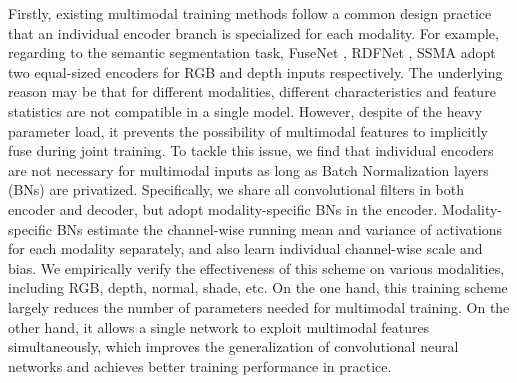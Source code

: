\documentclass[sigconf]{acmart}
\begin{document}
Firstly, existing multimodal training methods follow a common design practice that an individual encoder branch is specialized for each modality. For example, regarding to the semantic segmentation task, FuseNet \cite{DBLP:conf/accv/HazirbasMDC16}, RDFNet \cite{DBLP:conf/iccv/LeePH17}, SSMA \cite{DBLP:journals/ijcv/RussakovskyDSKS15} adopt two equal-sized encoders for RGB and depth inputs respectively. The underlying reason may be that for different modalities, different characteristics and feature statistics are not compatible in a single model. However, despite of the heavy parameter load, it prevents the possibility of multimodal features to implicitly fuse during joint training. To tackle this issue, we find that individual encoders are not necessary for multimodal inputs as long as Batch Normalization layers (BNs) \cite{DBLP:conf/icml/IoffeS15} are privatized. Specifically, we share all convolutional filters in both encoder and decoder, but adopt modality-specific BNs in the encoder. Modality-specific BNs estimate the channel-wise running mean and variance of activations for each modality separately, and also learn individual channel-wise scale and bias. We empirically verify the effectiveness of this scheme on various modalities, including RGB, depth, normal, shade, etc. On the one hand, this training scheme largely reduces the number of parameters needed for multimodal training. On the other hand, it allows a single network to exploit multimodal features simultaneously, which improves the generalization of convolutional neural networks and achieves better training performance in practice.
\end{document}

